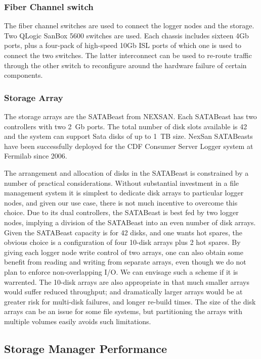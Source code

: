 \subsubsection{Fiber Channel switch}

The fiber channel switches are used to connect the logger nodes and the storage. 
Two QLogic SanBox 5600 switches are used. 
Each chassis includes sixteen 4Gb ports, plus a four-pack of high-speed 10Gb ISL ports 
of which one is used to connect the two switches.
The latter interconnect can be used to re-route traffic through the other switch
to reconfigure around the hardware failure of certain components.

\subsubsection{Storage Array}

The storage arrays are the SATABeast from NEXSAN. 
Each SATABeast has two controllers with two 2~Gb ports.
The total number of disk slots available is 42 and the system can support Sata disks 
of up to 1~TB size. 
NexSan SATABeasts have been successfully deployed for the CDF Consumer Server Logger system 
at Fermilab since 2006.

The arrangement and allocation of disks in the SATABeast is constrained by a number
of practical considerations.
Without substantial investment in a file management system it is simplest
to dedicate disk arrays to particular logger nodes, and given our use case, 
there is not much incentive to overcome this choice.
Due to its dual controllers, the SATABeast is best fed by two logger nodes,
implying a division of the SATABeast into an even number of disk arrays.
Given the  SATABeast capacity is for 42 disks, and one wants hot spares, 
the obvious choice is a configuration of four 10-disk arrays plus 2 hot spares.
By giving each logger node write control of two arrays, one can also obtain some benefit
from reading and writing from separate arrays, even though we do not plan
to enforce non-overlapping I/O. We can envisage such a scheme if it is warrented.
The 10-disk arrays are also appropriate in that much smaller arrays would
suffer reduced throughput; and dramatically larger arrays would be at greater
risk for multi-disk failures, and longer re-build times.
The size of the disk arrays can be an issue for some file systems, 
but partitioning the arrays with multiple volumes easily avoids such limitations.


\subsection{Storage Manager Performance}

